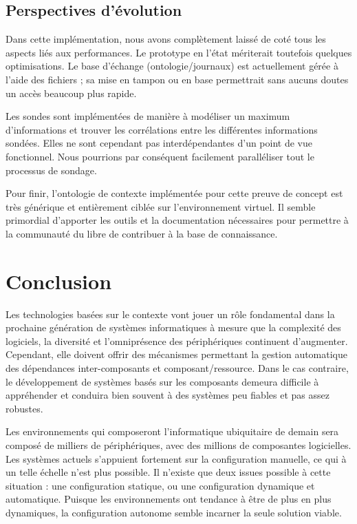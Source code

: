 \subsection{Perspectives d'évolution}

Dans cette implémentation, nous avons complètement laissé de coté tous les
aspects liés aux performances. Le prototype en l'état mériterait toutefois
quelques optimisations. Le base d'échange (ontologie/journaux) est actuellement
gérée à l'aide des fichiers ; sa mise en tampon ou en base permettrait sans
aucuns doutes un accès beaucoup plus rapide.

Les sondes sont implémentées de manière à modéliser un maximum d'informations
et trouver les corrélations entre les différentes informations sondées. Elles
ne sont cependant pas interdépendantes d'un point de vue fonctionnel. Nous
pourrions par conséquent facilement paralléliser tout le processus de sondage.

Pour finir, l'ontologie de contexte implémentée pour cette preuve de concept
est très générique et entièrement ciblée sur l'environnement virtuel. Il semble
primordial d'apporter les outils et la documentation nécessaires pour permettre
à la communauté du libre de contribuer à la base de connaissance.

\section{Conclusion}

Les technologies basées sur le contexte vont jouer un rôle fondamental dans la
prochaine génération de systèmes informatiques à mesure que la complexité des
logiciels, la diversité et l'omniprésence des périphériques continuent
d'augmenter. Cependant, elle doivent offrir des mécanismes permettant la
gestion automatique des dépendances inter-composants et composant/ressource.
Dans le cas contraire, le développement de systèmes basés sur les composants
demeura difficile à appréhender et conduira bien souvent à des systèmes peu
fiables et pas assez robustes.

Les environnements qui composeront l'informatique ubiquitaire de demain sera
composé de milliers de périphériques, avec des millions de composantes
logicielles. Les systèmes actuels s'appuient fortement sur la configuration
manuelle, ce qui à un telle échelle n'est plus possible. Il n'existe que deux
issues possible à cette situation : une configuration statique, ou une
configuration dynamique et automatique. Puisque les environnements ont
tendance à être de plus en plus dynamiques, la configuration autonome semble
incarner la seule solution viable.


